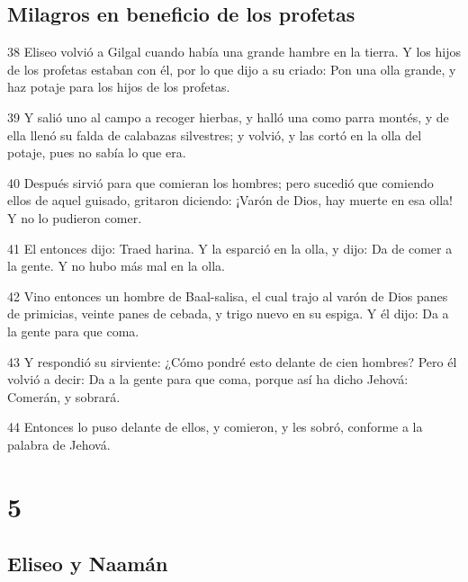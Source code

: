 \section*{Milagros en beneficio de los profetas}

\par 38 Eliseo volvió a Gilgal cuando había una grande hambre en la tierra. Y los hijos de los profetas estaban con él, por lo que dijo a su criado: Pon una olla grande, y haz potaje para los hijos de los profetas.
\par 39 Y salió uno al campo a recoger hierbas, y halló una como parra montés, y de ella llenó su falda de calabazas silvestres; y volvió, y las cortó en la olla del potaje, pues no sabía lo que era.
\par 40 Después sirvió para que comieran los hombres; pero sucedió que comiendo ellos de aquel guisado, gritaron diciendo: ¡Varón de Dios, hay muerte en esa olla! Y no lo pudieron comer.
\par 41 El entonces dijo: Traed harina. Y la esparció en la olla, y dijo: Da de comer a la gente. Y no hubo más mal en la olla.
\par 42 Vino entonces un hombre de Baal-salisa, el cual trajo al varón de Dios panes de primicias, veinte panes de cebada, y trigo nuevo en su espiga. Y él dijo: Da a la gente para que coma.
\par 43 Y respondió su sirviente: ¿Cómo pondré esto delante de cien hombres? Pero él volvió a decir: Da a la gente para que coma, porque así ha dicho Jehová: Comerán, y sobrará.
\par 44 Entonces lo puso delante de ellos, y comieron, y les sobró, conforme a la palabra de Jehová.

\chapter{5}

\section*{Eliseo y Naamán}


